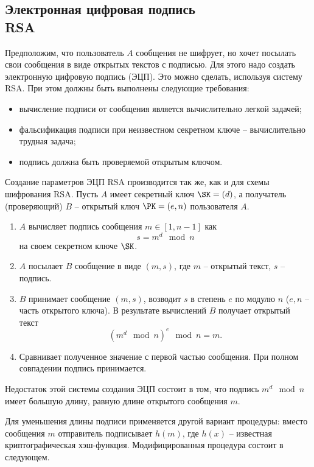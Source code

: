 \subsection[Электронная цифровая подпись]{Электронная цифровая подпись \protect\\ RSA}

Предположим, что пользователь $A$ сообщения не шифрует, но хочет посылать свои сообщения в виде открытых текстов с подписью. Для этого надо создать электронную цифровую подпись (ЭЦП). Это можно сделать, используя систему RSA. При этом должны быть выполнены следующие требования:
\begin{itemize}
    \item вычисление подписи от сообщения является  вычислительно легкой задачей;
    \item фальсификация подписи при неизвестном секретном ключе -- вычислительно трудная задача;
    \item подпись должна быть проверяемой открытым ключом.
\end{itemize}

Создание параметров ЭЦП RSA производится так же, как и для схемы шифрования RSA. Пусть  $A$ имеет секретный ключ $\SK = (d)$, а получатель (проверяющий) $B$ -- открытый ключ $\PK = (e,n)$ пользователя $A$.

\begin{enumerate}
    \item $A$ вычисляет подпись сообщения $m \in [1,n-1]$ как
        \[ s = m^{d} \mod n \]
        на своем секретном ключе $\SK$.
    \item $A$ посылает $B$ сообщение в виде $(m, s)$, где $m$ -- открытый текст, $s$ -- подпись.
    \item $B$ принимает сообщение $(m, s)$, возводит $s$ в степень $e$ по модулю $n$ ($e, n$ -- часть открытого ключа). В результате вычислений $B$ получает открытый текст
        \[ \left( m^{d} \mod n \right)^{e} \mod n = m. \]
    \item Сравнивает полученное значение с первой частью сообщения. При полном совпадении подпись принимается.
\end{enumerate}
Недостаток этой системы создания ЭЦП состоит в том, что подпись $m^{d} \mod n$ имеет большую длину, равную длине открытого сообщения $m$.

Для уменьшения длины подписи применяется другой вариант процедуры: вместо сообщения $m$ отправитель подписывает $h(m)$, где $h(x)$ -- известная криптографическая хэш-функция. Модифицированная процедура состоит в следующем.

